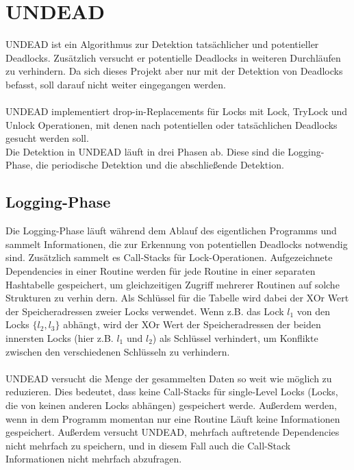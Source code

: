 \section{UNDEAD}
UNDEAD \cite{zhou} ist ein Algorithmus zur Detektion tatsächlicher und 
potentieller Deadlocks. Zusätzlich versucht er potentielle Deadlocks 
in weiteren Durchläufen zu verhindern. Da sich dieses Projekt aber nur mit der 
Detektion von Deadlocks befasst, soll darauf nicht weiter eingegangen werden.\\\\ 
UNDEAD implementiert drop-in-Replacements für Locks mit Lock, TryLock und Unlock
Operationen, mit denen nach potentiellen oder tatsächlichen Deadlocks gesucht 
werden soll.\\
Die Detektion in UNDEAD läuft in drei Phasen ab. Diese sind die Logging-Phase, 
die periodische Detektion und die abschließende Detektion.
\subsection{Logging-Phase}
Die Logging-Phase läuft während dem Ablauf des eigentlichen Programms und sammelt
Informationen, die zur Erkennung von potentiellen Deadlocks notwendig sind. 
Zusätzlich sammelt es Call-Stacks für Lock-Operationen. Aufgezeichnete 
Dependencies in einer Routine werden für jede Routine in einer separaten 
Hashtabelle gespeichert, um gleichzeitigen Zugriff mehrerer Routinen auf solche 
Strukturen zu verhin
dern. Als Schlüssel für die Tabelle wird dabei der XOr 
Wert der Speicheradressen zweier Locks verwendet. Wenn z.B. das Lock $l_1$ 
von den Locks $\{l_2, l_3\}$ abhängt, wird der XOr Wert der Speicheradressen der 
beiden innersten Locks (hier z.B. $l_1$ und $l_2$) als Schlüssel verhindert, um 
Konflikte zwischen den verschiedenen Schlüsseln zu verhindern.\\\\
UNDEAD versucht die Menge der gesammelten Daten so weit wie möglich zu reduzieren.
Dies bedeutet, dass keine Call-Stacks für single-Level Locks (Locks, die von 
keinen anderen Locks abhängen) gespeichert werde.
Außerdem werden, wenn in dem Programm momentan nur eine Routine Läuft keine 
Informationen gespeichert. Außerdem versucht UNDEAD, mehrfach auftretende
Dependencies nicht mehrfach zu speichern, und in diesem Fall auch die Call-Stack
Informationen nicht mehrfach abzufragen.
